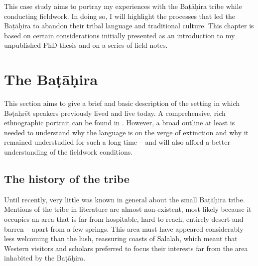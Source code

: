 \documentclass[output=paper]{langscibook}
\begin{document}
This case study aims to portray my experiences with the Baṭāḥira tribe while conducting fieldwork. In doing so, I will highlight the processes that led the Baṭāḥira to abandon their tribal language and traditional culture. This chapter is based on certain considerations initially presented as an introduction to my unpublished PhD thesis \citep{gasparini_bathari_2018} and on a series of field notes. 

\section{The Baṭāḥira}

This section aims to give a brief and basic description of the setting in which Bəṭaḥrēt speakers previously lived and live today. A comprehensive, rich ethnographic portrait can be found in \citet{morris_collection_nodate}. However, a broad outline at least is needed to understand why the language is on the verge of extinction and why it remained understudied for such a long time – and will also afford a better understanding of the fieldwork conditions. 

\subsection{The history of the tribe}

Until recently, very little was known in general about the small Baṭāḥira tribe. Mentions of the tribe in literature are almost non-existent, most likely because it occupies an area that is far from hospitable, hard to reach, entirely desert and barren – apart from a few springs. This area must have appeared considerably less welcoming than the lush, reassuring coasts of Salalah, which meant that Western visitors and scholars preferred to focus their interests far from the area inhabited by the Baṭāḥira. 
\end{document}
